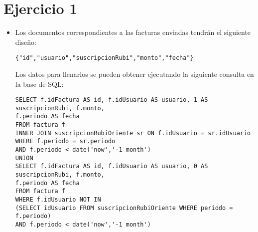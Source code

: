 \section{Ejercicio 1}
\begin{itemize}
\item Los documentos correspondientes a las facturas enviadas tendr\'an el siguiente dise\~no:
\begin{verbatim}
{"id","usuario","suscripcionRubi","monto","fecha"}
\end{verbatim}
Los datos para llenarlos se pueden obtener ejecutando la siguiente consulta en la base de SQL:
\begin{verbatim}
SELECT f.idFactura AS id, f.idUsuario AS usuario, 1 AS suscripcionRubi, f.monto, 
f.periodo AS fecha
FROM factura f 
INNER JOIN suscripcionRubiOriente sr ON f.idUsuario = sr.idUsuario
WHERE f.periodo = sr.periodo 
AND f.periodo < date('now','-1 month')
UNION 
SELECT f.idFactura AS id, f.idUsuario AS usuario, 0 AS suscripcionRubi, f.monto, 
f.periodo AS fecha
FROM factura f
WHERE f.idUsuario NOT IN 
(SELECT idUsuario FROM suscripcionRubiOriente WHERE periodo = f.periodo)
AND f.periodo < date('now','-1 month')
\end{verbatim}


\end{itemize}
